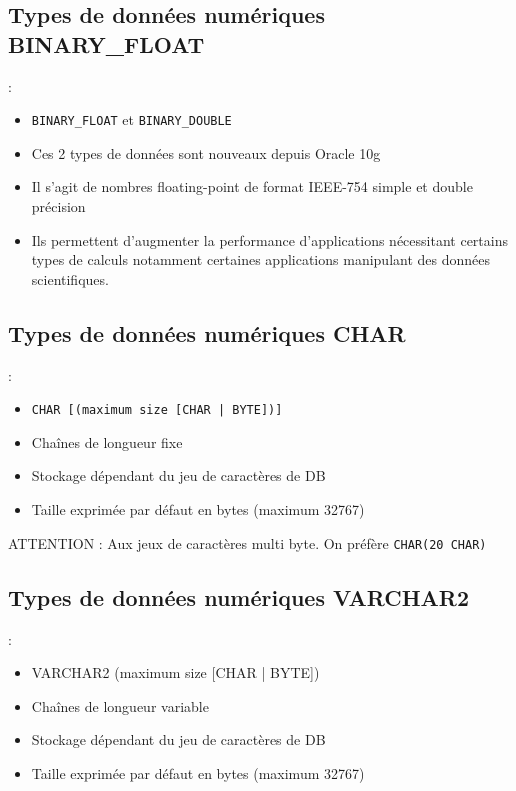 \documentclass[10pt]{beamer}
\begin{document}
\subsection{Types de données numériques BINARY\_FLOAT}
\begin{frame}{\secname : \subsecname}
    \begin{itemize}
        \item \lstinline[language=xml]!BINARY_FLOAT! et \lstinline[language=xml]!BINARY_DOUBLE!
        \item Ces 2 types de données sont nouveaux depuis Oracle 10g
        \item Il s'agit de nombres floating-point de format IEEE-754 simple et double précision
        \item Ils permettent d'augmenter la performance d'applications nécessitant certains types de calculs notamment certaines applications manipulant des données scientifiques.
    \end{itemize}
\end{frame}

\subsection{Types de données numériques CHAR}
\begin{frame}{\secname : \subsecname}
    \begin{itemize}
        \item \lstinline[language=xml]!CHAR [(maximum size [CHAR | BYTE])]!
        \item Chaînes de longueur fixe
        \item Stockage dépendant du jeu de caractères de DB
        \item Taille exprimée par défaut en bytes (maximum 32767)
    \end{itemize}
    ATTENTION : Aux jeux de caractères multi byte. On préfère \lstinline[language=xml]!CHAR(20 CHAR)!
\end{frame}

\subsection{Types de données numériques VARCHAR2}
\begin{frame}{\secname : \subsecname}
    \begin{itemize}
        \item VARCHAR2 (maximum size [CHAR | BYTE])
        \item Chaînes de longueur variable
        \item Stockage dépendant du jeu de caractères de DB
        \item Taille exprimée par défaut en bytes (maximum 32767)
    \end{itemize}
\end{frame}
\end{document}
